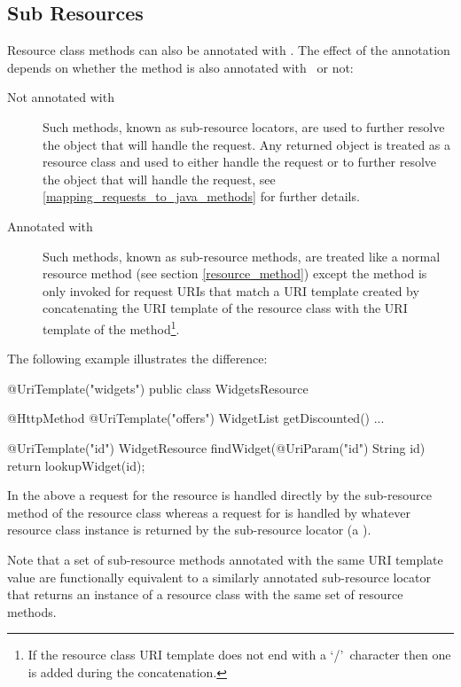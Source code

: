 \subsection{Sub Resources}
\label{sub_resources}

Resource class methods can also be annotated with \UriTemplate. The effect of the annotation depends on whether the method is also annotated with \HttpMethod\ or not:

\begin{description}
\item[Not annotated with \HttpMethod] Such methods, known as sub-resource locators, are used to further resolve the object that will handle the request. Any returned object is treated as a resource class and used to either handle the request or to further resolve the object that will handle the request, see \ref{mapping_requests_to_java_methods} for further details.
\item[Annotated with \HttpMethod] Such methods, known as sub-resource methods, are treated like a normal resource method (see section \ref{resource_method}) except the method is only invoked for request URIs that match a URI template created by concatenating the URI template of the resource class with the URI template of the method\footnote{If the resource class URI template does not end with a \lq/\rq\ character then one is added during the concatenation.}.
\end{description}

The following example illustrates the difference:

\begin{listing}{1}
@UriTemplate("widgets")
public class WidgetsResource {
  @HttpMethod
  @UriTemplate("offers")
  WidgetList getDiscounted() {...}
  
  @UriTemplate("{id}")
  WidgetResource findWidget(@UriParam("id") String id) {
    return lookupWidget(id);
  }
}\end{listing}

In the above a  request for the  resource is handled directly by the  sub-resource method of the resource class  whereas a  request for  is handled by whatever resource class instance is returned by the  sub-resource locator (a ).

Note that a set of sub-resource methods annotated with the same URI template value are functionally equivalent to a similarly annotated sub-resource locator that returns an instance of a resource class with the same set of resource methods.

